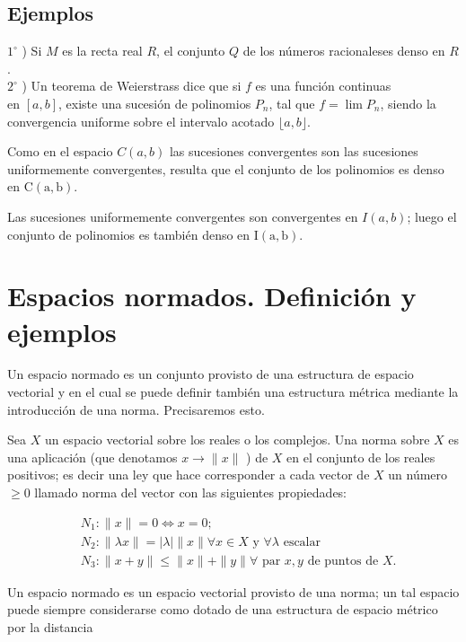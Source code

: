 \documentclass[10pt]{article}
\theoremstyle{plain}
\theoremstyle{definition}
\theoremstyle{remark}
\begin{document}
\subsection{Ejemplos}
$1^{\circ}$ ) Si $M$ es la recta real $R$, el conjunto $Q$ de los números racionaleses denso en $R$.\\
$2^{\circ}$ ) Un teorema de Weierstrass dice que si $f$ es una función continuas\\
en $[a, b]$, existe una sucesión de polinomios $P_{n}$, tal que $f=\lim P_{n}$, siendo la convergencia uniforme sobre el intervalo acotado $\lfloor a, b\rfloor$.

Como en el espacio $C(a, b)$ las sucesiones convergentes son las sucesiones uniformemente convergentes, resulta que el conjunto de los polinomios es denso en $\mathrm{C}(\mathrm{a}, \mathrm{b})$.

Las sucesiones uniformemente convergentes son convergentes en $I(a, b)$; luego el conjunto de polinomios es también denso en $\mathrm{I}(\mathrm{a}, \mathrm{b})$.

\section{Espacios normados. Definición y ejemplos}
Un espacio normado es un conjunto provisto de una estructura de espacio vectorial y en el cual se puede definir también una estructura métrica mediante la introducción de una norma. Precisaremos esto.

Sea $X$ un espacio vectorial sobre los reales o los complejos. Una norma sobre $X$ es una aplicación (que denotamos $x \rightarrow\|x\|$ ) de $X$ en el conjunto de los reales positivos; es decir una ley que hace corresponder a cada vector de $X$ un número $\geqslant 0$ llamado norma del vector con las siguientes propiedades:

$$
\begin{aligned}
& N_{1}:\|x\|=0 \Longleftrightarrow x=0 ; \\
& N_{2}:\|\lambda x\|=|\lambda|\|x\| \forall x \in X \text { y } \forall \lambda \text { escalar } \\
& N_{3}:\|x+y\| \leqslant\|x\|+\|y\| \forall \text { par } x, y \text { de puntos de } X .
\end{aligned}
$$

Un espacio normado es un espacio vectorial provisto de una norma; un tal espacio puede siempre considerarse como dotado de una estructura de espacio métrico por la distancia
\end{document}
